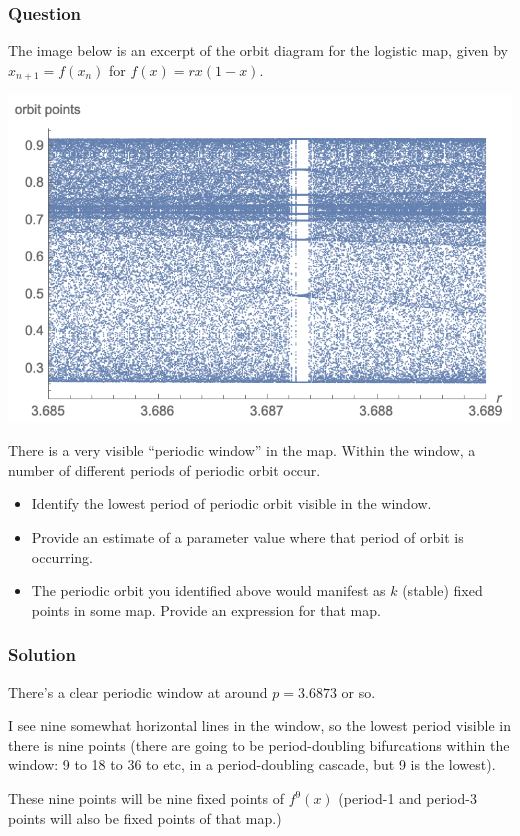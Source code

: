 \documentclass[12pt,letterpaper,noanswers]{exam}
\begin{document}
\subsubsection{Question}
The image below is an excerpt of the orbit diagram for the logistic map, given by $x_{n+1} = f(x_n)$ for $f(x) = rx(1-x).$

\includegraphics{img/C28-2019-11-11p2.png}

There is a very visible ``periodic window'' in the map.  Within the window, a number of different periods of periodic orbit occur.

\begin{itemize}
    \item Identify the lowest period of periodic orbit visible in the window.
    \item Provide an estimate of a parameter value where that period of orbit is occurring.
    \item The periodic orbit you identified above would manifest as $k$ (stable) fixed points in some map.  Provide an expression for that map.
\end{itemize}  

\subsubsection{Solution}
There's a clear periodic window at around $p = 3.6873$ or so.

I see nine somewhat horizontal lines in the window, so the lowest period visible in there is nine points (there are going to be period-doubling bifurcations within the window: 9 to 18 to 36 to etc, in a period-doubling cascade, but 9 is the lowest).

These nine points will be nine fixed points of $f^9(x)$ (period-1 and period-3 points will also be fixed points of that map.)
\end{document}
